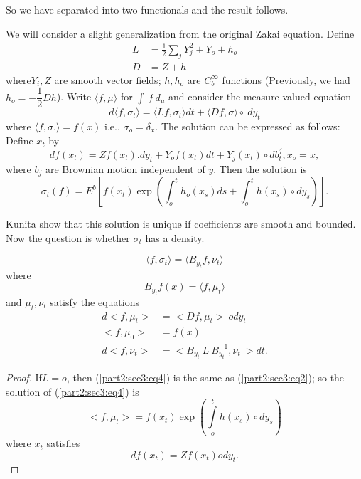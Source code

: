 So we have separated into two functionals and the result follows.

\medskip
{}
 We will consider a slight generalization from the original Zakai
 equation. Define  
\begin{align*}
  L & = \frac{1}{2}\sum_j Y^2_j + Y_o + h_o\\
  D & = Z + h
\end{align*}
where\pageoriginale $Y_i,Z$ are smooth vector fields; $h,h_o$ are $C^\infty_b$
functions (Previously, we had $h_o = -\dfrac{1}{2}Dh$). Write $\langle
f, \mu \rangle$ for $\int ~ f ~d_\mu$ and consider the measure-valued
equation 
\begin{equation*}
  d \langle f, \sigma_t \rangle =  \langle Lf,\sigma_t \rangle dt +
  \langle Df,\sigma \rangle \circ ~ dy_t\tag{2}\label{part2:sec3:eq2}  
\end{equation*}
where $\langle f, \sigma. \rangle = f(x)$ i.e., $\sigma_o =
\delta_x$. The solution can be expressed as follows: Define $x_t$ by   
$$
df(x_t) = Zf(x_t).dy_t + Y_of(x_t)dt + Y_j(x_t) \circ db^j_t, x_o = x, 
$$
where $b_j$ are Brownian motion independent of $y$. Then the solution
is 
$$
\sigma_t(f) = E^b\left[ f(x_t)\exp\left(\int^t_o h_o (x_s)ds + \int^t_o
  h(x_s) \circ dy_s \right) \right]. 
$$

Kunita \cite{key17} show that this solution is unique if coefficients are\break
smooth and bounded. Now the question is whether $\sigma_t$ has a
density. 

\begin{theorem}%
  \begin{equation}
    \langle f,\sigma_t \rangle = \langle B_{y_t} f,\nu_t \rangle
    \tag{3}\label{part2:sec3:eq3}  
  \end{equation}
  where 
  $$
  B_{y_t} f(x) = \langle f, \mu_t \rangle 
  $$
  and $\mu_t,\nu_t$ satisfy the equations
  \begin{align*}
    d < f, \mu_t >  &= <Df, \mu_t > ~ ody_t  \tag{4}\label{part2:sec3:eq4}  \\
    < f, \mu_0 >  &= f(x) \\
    d < f, \nu_t >  &= <  B_{y_{t}}~  L ~ B^{-1}_{y_{t}}, \nu_t ~  >
    dt. \tag{5}\label{part2:sec3:eq5}  
  \end{align*}
\end{theorem}


\begin{proof}
  If\pageoriginale  $ L= o $, then (\ref{part2:sec3:eq4}) is the same
  as  (\ref{part2:sec3:eq2}); so the   solution  of (\ref{part2:sec3:eq4}) is   
  $$
  <f, \mu_t  > = f(x_t) \exp \left( \int \limits^{t}_{o}  h(x_s)
  \circ dy_s \right)  
  $$
  where  $ x_t $ satisfies 
  $$
  df (x_t) = Zf (x_t) ody_t.
  $$
\end{proof}


